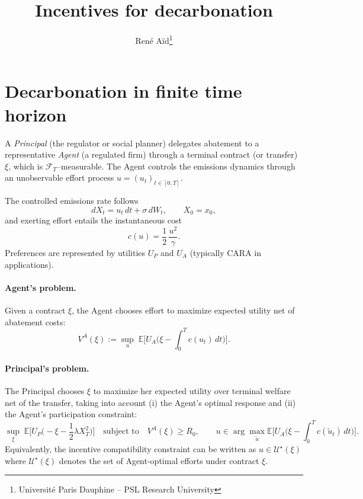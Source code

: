\documentclass[a4paper,10pt]{article}
\newcommand{\E}{\mathbb{E}}
\theoremstyle{definition}
\theoremstyle{plain}
\numberwithin{equation}{section}
\newcommand{\hs}{\vspace{3mm}}
\begin{document}
\title{Incentives for decarbonation}
\author{René Aïd\thanks{Université Paris Dauphine -- PSL Research University}}
\maketitle

\tableofcontents

\section{Decarbonation in finite time horizon}\label{sec:finite}

A \emph{Principal} (the regulator or social planner) delegates abatement to a representative \emph{Agent}
(a regulated firm) through a terminal contract (or transfer) $\xi$, which is $\mathcal{F}_T$--measurable.
The Agent controls the emissions dynamics through an unobservable effort process $u=(u_t)_{t\in[0,T]}$.

The controlled emissions rate follows
\[
dX_t = u_t\,dt + \sigma\,dW_t,
\qquad X_0=x_0,
\]
and exerting effort entails the instantaneous cost
\[
c(u)=\frac12\,\frac{u^2}{\gamma}.
\]
Preferences are represented by utilities $U_P$ and $U_A$ (typically CARA in applications).

\paragraph{Agent's problem.}
Given a contract $\xi$, the Agent chooses effort to maximize expected utility net of abatement costs:
\[
V^A(\xi)
:=
\sup_{u}\;
\E\Big[
U_A\Big(
\xi-\int_0^T c(u_t)\,dt
\Big)
\Big].
\]

\paragraph{Principal's problem.}
The Principal chooses $\xi$ to maximize her expected utility over terminal welfare net of the transfer,
taking into account (i) the Agent's optimal response and (ii) the Agent's participation constraint:
\[
\sup_{\xi}\;
\E\Big[
U_P\Big(
-\xi-\frac12\lambda X_T^2
\Big)
\Big]
\quad\text{subject to}\quad
V^A(\xi)\ge R_0,
\qquad
u\in\arg\max_{\tilde u}\E\Big[
U_A\Big(
\xi-\int_0^T c(\tilde u_t)\,dt
\Big)
\Big].
\]
Equivalently, the incentive compatibility constraint can be written as $u\in\mathcal{U}^\star(\xi)$ where
$\mathcal{U}^\star(\xi)$ denotes the set of Agent-optimal efforts under contract $\xi$.

\hs
\end{document}
